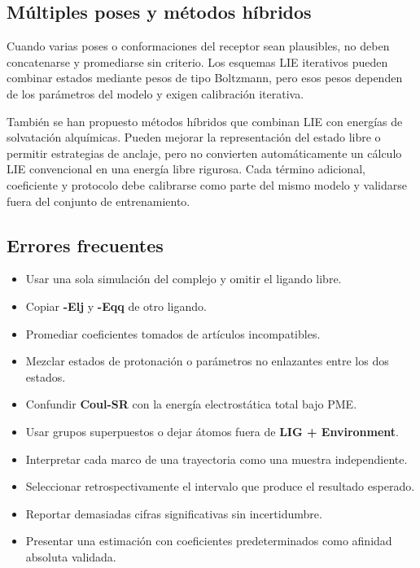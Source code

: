 \documentclass[
  spanish,
  11pt,
  a4paper]{article}
\providecommand{\tightlist}{%
  \setlength{\itemsep}{0pt}\setlength{\parskip}{0pt}}
\begin{document}
\subsection{Múltiples poses y métodos
híbridos}\label{muxfaltiples-poses-y-muxe9todos-huxedbridos}

Cuando varias poses o conformaciones del receptor sean plausibles, no
deben concatenarse y promediarse sin criterio. Los esquemas LIE
iterativos pueden combinar estados mediante pesos de tipo Boltzmann,
pero esos pesos dependen de los parámetros del modelo y exigen
calibración iterativa.

También se han propuesto métodos híbridos que combinan LIE con energías
de solvatación alquímicas. Pueden mejorar la representación del estado
libre o permitir estrategias de anclaje, pero no convierten
automáticamente un cálculo LIE convencional en una energía libre
rigurosa. Cada término adicional, coeficiente y protocolo debe
calibrarse como parte del mismo modelo y validarse fuera del conjunto de
entrenamiento.

\subsection{Errores frecuentes}\label{errores-frecuentes-3}

\begin{itemize}
\tightlist
\item
  Usar una sola simulación del complejo y omitir el ligando libre.
\item
  Copiar \textbf{-Elj} y \textbf{-Eqq} de otro ligando.
\item
  Promediar coeficientes tomados de artículos incompatibles.
\item
  Mezclar estados de protonación o parámetros no enlazantes entre los
  dos estados.
\item
  Confundir \textbf{Coul-SR} con la energía electrostática total bajo
  PME.
\item
  Usar grupos superpuestos o dejar átomos fuera de \textbf{LIG +
  Environment}.
\item
  Interpretar cada marco de una trayectoria como una muestra
  independiente.
\item
  Seleccionar retrospectivamente el intervalo que produce el resultado
  esperado.
\item
  Reportar demasiadas cifras significativas sin incertidumbre.
\item
  Presentar una estimación con coeficientes predeterminados como
  afinidad absoluta validada.
\end{itemize}
\end{document}
